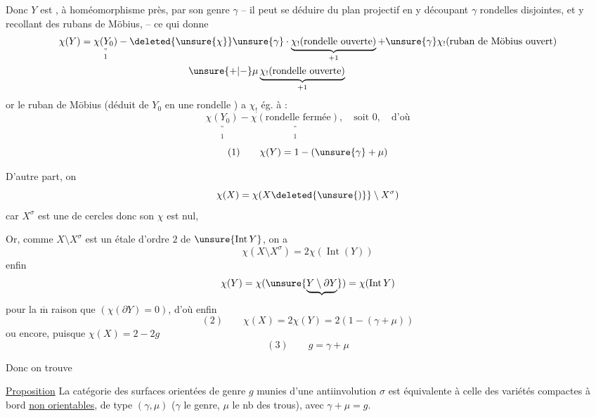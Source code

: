 
Donc $Y$ est , à homéomorphisme près, par son genre $\gamma$  -- il peut se déduire du plan projectif  en y découpant $\gamma$ rondelles disjointes, et y recollant des rubans de Möbius,  -- ce qui donne
\[
\begin{aligned}
\chi(Y)&=\underset{\substack{\text{''}\\1}}{\chi(Y_0)}
-\deleted{\unsure{\chi}}\unsure{\gamma}\cdot
\underbrace{\chi_!(\text{rondelle ouverte})}_{+1}
+\unsure{\gamma}\chi_!(\text{ruban de Möbius ouvert})\\
&\hspace{11em}\unsure{+|-}\mu\underbrace{\chi_!(\text{rondelle ouverte})}_{+1}
\end{aligned}
\]
or le ruban de Möbius  (déduit de $Y_0$ en  une rondelle ) a  $\chi_!$ ég. à :
\[
\underset{\substack{\text{''}\\1}}{\chi(Y_0)}-
\underset{\substack{\text{''}\\1}}{\chi(\text{rondelle fermée})},
\quad \text{soit }0,\quad \text{d'où}
\]
\[
(1)\qquad \chi(Y)=1-(\unsure{\gamma}+\mu)
\]

D'autre part, on 
\[
\chi(X)=\chi(X\deleted{\unsure{)}}\setminus X^\sigma)
\]
car $X^\sigma$ est une  de cercles donc son $\chi$ est nul,


Or, comme $X\setminus X^\sigma$ est un  étale d'ordre $2$ de $\unsure{\operatorname{Int}Y}$, on a
\[
\chi(X\setminus X^\sigma)=2\chi(\operatorname{Int}(Y))
\]
enfin
\[
\chi(Y)=\chi(\unsure{\underbrace{Y\setminus\partial Y}})=\chi(\operatorname{Int}Y)
\]
pour la $\overline{\mathrm m}$ raison que  $(\chi(\partial Y)=0)$,
d'où enfin
\[
(2)\qquad \chi(X)=2\chi(Y)=2(1-(\gamma+\mu))
\]
 ou encore, puisque $\chi(X)=2-2g$
\[
(3)\qquad g=\gamma+\mu
\]

Donc on trouve


\uline{Proposition} La catégorie des surfaces orientées  de genre $g$ munies d'une antiinvolution $\sigma$ est équivalente à celle des variétés compactes à bord \uline{non orientables}, de type $(\gamma,\mu)$ ($\gamma$ le genre, $\mu$ le nb des trous), avec $\gamma+\mu=g$.

